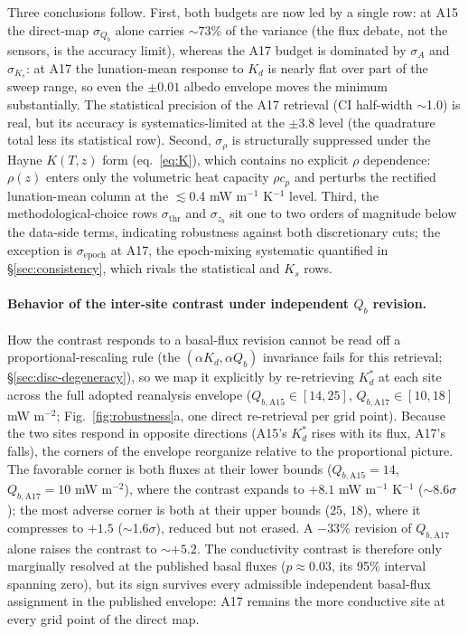 \documentclass[11pt]{article}
\begin{document}
Three conclusions follow. First, both budgets are now led by a single
row: at A15 the direct-map $\sigma_{Q_b}$ alone carries $\sim$73\% of
the variance (the flux debate, not the sensors, is the accuracy limit),
whereas the A17 budget is dominated by
$\sigma_A$ and $\sigma_{K_s}$: at A17 the lunation-mean response to $K_d$ is
nearly flat over part of the sweep range, so even the $\pm0.01$ albedo
envelope moves the minimum substantially. The statistical precision of
the A17 retrieval (CI half-width $\sim$1.0) is real, but its accuracy is
systematics-limited at the $\pm$3.8 level (the quadrature total less its
statistical row). Second, $\sigma_\rho$ is
structurally suppressed under the Hayne $K(T,z)$ form (eq.~\ref{eq:K}),
which contains no explicit $\rho$ dependence: $\rho(z)$ enters only the
volumetric heat capacity $\rho c_p$ and perturbs the rectified lunation-mean
column at the $\lesssim$0.4 mW m$^{-1}$ K$^{-1}$ level. Third, the
methodological-choice rows $\sigma_\mathrm{thr}$ and $\sigma_{z_b}$ sit
one to two orders of magnitude below the data-side terms, indicating
robustness against both discretionary cuts; the exception is
$\sigma_\mathrm{epoch}$ at A17, the epoch-mixing systematic quantified in
\S\ref{sec:consistency}, which rivals the statistical and $K_s$ rows.

\paragraph*{Behavior of the inter-site contrast under independent $Q_b$ revision.}
How the contrast responds to a basal-flux revision cannot be read off a
proportional-rescaling rule (the $(\alpha K_d,\alpha Q_b)$ invariance
fails for this retrieval; \S\ref{sec:disc-degeneracy}), so we map it
explicitly by re-retrieving $K_d^{*}$ at each site across the full
adopted reanalysis envelope ($Q_{b,\mathrm{A15}}\in[14,25]$,
$Q_{b,\mathrm{A17}}\in[10,18]$ mW m$^{-2}$; Fig.~\ref{fig:robustness}a,
one direct re-retrieval per grid point).
Because the two sites respond in opposite directions
(A15's $K_d^{*}$ rises with its flux, A17's falls), the corners of the
envelope reorganize relative to the proportional picture. The
favorable corner is both fluxes at their lower bounds
($Q_{b,\mathrm{A15}}=14$, $Q_{b,\mathrm{A17}}=10$ mW m$^{-2}$), where
the contrast expands to $+8.1$ mW m$^{-1}$ K$^{-1}$
($\sim$8.6$\sigma$); the most adverse corner is both at their upper
bounds ($25$, $18$), where it compresses to $+1.5$
($\sim$1.6$\sigma$), reduced but not erased. A $-33\%$ revision of
$Q_{b,\mathrm{A17}}$ alone raises the contrast to $\sim$$+5.2$.
The conductivity contrast is therefore only marginally resolved at the
published basal fluxes ($p\approx 0.03$, its 95\% interval spanning
zero), but its sign survives every admissible independent
basal-flux assignment in the published envelope: A17 remains the more
conductive site at every grid point of the direct map.
\end{document}
